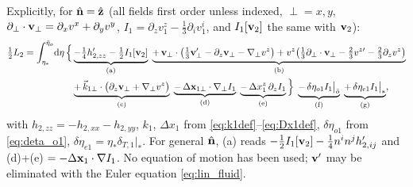 Explicitly, for $\hat{\mathbf n}=\hat{\mathbf z}$ (all fields first order unless indexed, $\perp=x,y$, $\partial_\perp\cdot\mathbf v_\perp=\partial_xv^x+\partial_yv^y$,
$I_1=\partial_zv^z_1-\tfrac13\partial_iv^i_1$, and $I_1[\mathbf v_2]$ the same with $\mathbf v_2$):
\begin{align}
\tfrac12L_2=\int_{\eta_*}^{\bar\eta_o}\!\mathrm d\eta\,\Big\{&
\underbrace{-\tfrac14h'_{2,zz}-\tfrac12I_1[\mathbf v_2]}_{\rm (a)}
\;\underbrace{+\,\mathbf v_\perp\cdot\big(\tfrac13\mathbf v_\perp'-\partial_z\mathbf v_\perp-\nabla_\perp v^z\big)+v^z\big(\tfrac13\partial_\perp\cdot\mathbf v_\perp-\tfrac23v^{z\prime}-\tfrac23\partial_zv^z\big)}_{\rm (b)}\nonumber\\
&\underbrace{+\,\vec k_{1\perp}\cdot\big(\partial_z\mathbf v_\perp+\nabla_\perp v^z\big)}_{\rm (c)}
\;\underbrace{-\,\Delta\mathbf x_{1\perp}\cdot\nabla_\perp I_1}_{\rm (d)}
\;\underbrace{-\,\Delta x_1^z\,\partial_zI_1}_{\rm (e)}\Big\}
\;\underbrace{-\,\delta\eta_{o1}I_1\big|_{\bar o}}_{\rm (f)}
\;\underbrace{+\,\delta\eta_{e1}I_1\big|_*}_{\rm (g)} ,
\label{eq:L2shear}
\end{align}
with $h_{2,zz}=-h_{2,xx}-h_{2,yy}$, $k_1$, $\Delta x_1$ from \eqref{eq:k1def}--\eqref{eq:Dx1def}, $\delta\eta_{o1}$ from
\eqref{eq:deta_o1}, $\delta\eta_{e1}=\eta_*\delta_{T,1}|_*$.  For general $\hat{\mathbf n}$, (a) reads $-\tfrac12I_1[\mathbf v_2]-\tfrac14n^in^jh'_{2,ij}$ and
(d)+(e) $=-\Delta\mathbf x_1\cdot\nabla I_1$.  No equation of motion has been used; $\mathbf v'$ may be eliminated with the Euler equation
\eqref{eq:lin_fluid}.

